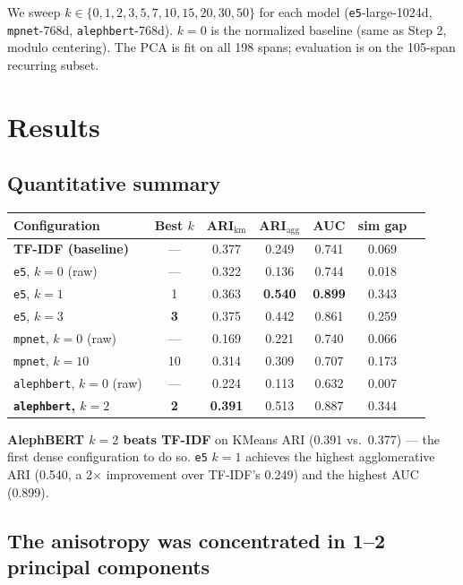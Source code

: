 \documentclass[11pt,a4paper]{article}
\begin{document}
We sweep $k \in \{0, 1, 2, 3, 5, 7, 10, 15, 20, 30, 50\}$ for each model
(\texttt{e5}-large-1024d, \texttt{mpnet}-768d, \texttt{alephbert}-768d).
$k=0$ is the normalized baseline (same as Step 2, modulo centering).
The PCA is fit on all 198 spans; evaluation is on the 105-span recurring subset.

\section{Results}

\subsection{Quantitative summary}

\begin{center}
\begin{tabular}{lcccccc}
\toprule
\textbf{Configuration} & \textbf{Best $k$} & \textbf{ARI$_\text{km}$} & \textbf{ARI$_\text{agg}$} & \textbf{AUC} & \textbf{sim gap} \\
\midrule
\textbf{TF-IDF (baseline)} & --- & 0.377 & 0.249 & 0.741 & 0.069 \\
\midrule
\texttt{e5}, $k=0$ (raw) & --- & 0.322 & 0.136 & 0.744 & 0.018 \\
\texttt{e5}, $k=1$        & 1   & 0.363 & \textbf{0.540} & \textbf{0.899} & 0.343 \\
\texttt{e5}, $k=3$        & \textbf{3}   & 0.375 & 0.442 & 0.861 & 0.259 \\
\midrule
\texttt{mpnet}, $k=0$ (raw) & --- & 0.169 & 0.221 & 0.740 & 0.066 \\
\texttt{mpnet}, $k=10$ & 10 & 0.314 & 0.309 & 0.707 & 0.173 \\
\midrule
\texttt{alephbert}, $k=0$ (raw) & --- & 0.224 & 0.113 & 0.632 & 0.007 \\
\textbf{\texttt{alephbert}, $k=2$} & \textbf{2} & \textbf{0.391} & 0.513 & 0.887 & 0.344 \\
\bottomrule
\end{tabular}
\end{center}

\noindent\textbf{AlephBERT $k=2$ beats TF-IDF} on KMeans ARI (0.391 vs.\ 0.377) --- the first
dense configuration to do so.  \texttt{e5} $k=1$ achieves the highest agglomerative ARI (0.540,
a 2$\times$ improvement over TF-IDF's 0.249) and the highest AUC (0.899).

\subsection{The anisotropy was concentrated in 1--2 principal components}
\end{document}
